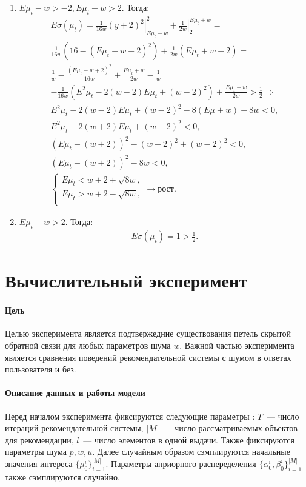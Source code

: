 \documentclass[12pt, twoside]{article}
\begin{document}
\begin{enumerate}
  \item $E\mu_t - w > -2, E\mu_t + w > 2$. Тогда: 
    \begin{gather*}
      E\sigma(\mu_t) = \left. \frac{1}{16 w} (y+2)^2 \right|_{E\mu_t-w}^{2} + \left. \frac{1}{2w}\right|_{2}^{E\mu_t + w} = \\ 
      \frac{1}{16 w} \left( 16 - (E \mu_t-w+2)^2 \right) + \frac{1}{2 w}(E\mu_t + w -2) = \\
      \frac{1}{w} - \frac{(E\mu_t-w+2)^2}{16w} + \frac{E\mu_t+w}{2w} - \frac{1}{w} = \\
      -\frac{1}{16w} (E^2\mu_t - 2(w-2)E\mu_t + (w-2)^2) + \frac{E\mu_t + w}{2 w} > \frac{1}{2} \Rightarrow \\
    E^2\mu_t - 2(w-2)E\mu_t + (w-2)^2 - 8(E\mu + w) + 8w < 0, \\
    E^2\mu_t - 2(w+2)E\mu_t + (w-2)^2 < 0, \\
    \left(E\mu_t - (w+2) \right)^2 - (w+2)^2 + (w-2)^2 < 0, \\
    (E\mu_t - (w+2))^2 - 8w < 0, \\
    \begin{cases}
      E\mu_t < w + 2 + \sqrt{8w}, \\
      E\mu_t > w + 2 - \sqrt{8w}, \\
    \end{cases} \to \text{рост}.
    \end{gather*}
  
  \item $E\mu_t - w > 2$. Тогда: 
    \begin{gather*}
      E\sigma(\mu_t) = 1 > \frac{1}{2}.
    \end{gather*}
\end{enumerate}
 
\section{Вычислительный эксперимент }
\paragraph{Цель}
Целью эксперимента является подтвержедние существования петель скрытой обратной связи для любых параметров шума $w$. 
Важной частью эксперимента является сравнения поведений рекомендательной системы с шумом в ответах пользователя и без. 

\paragraph{Описание данных и работы модели}
Перед началом эксперимента фиксируются следующие параметры : $T$~--- число итераций рекомендательной системы, $|M|$~--- число рассматриваемых объектов для рекомендации, $l$~--- число элементов в одной выдачи. 
Также фиксируются параметры шума $p, w, u$.
Далее случайным образом сэмплируются начальные значения интереса $\{\mu_0^i\}_{i=1}^{|M|}$. 
Параметры априорного распеределения $\{\alpha_0^i, \beta_0^i\}_{i=1}^{|M|}$  также сэмплируются случайно.
\end{document}
